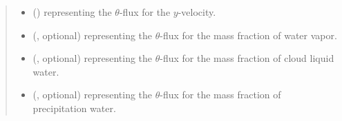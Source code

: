 \documentclass[letterpaper,10pt,english]{sphinxmanual}
\begin{document}
\begin{fulllineitems}
\begin{fulllineitems}
\begin{quote}
\begin{description}
\begin{itemize}
\item {} 
 () \textendash{}  representing the \(\theta\)-flux for the \(y\)-velocity.

\item {} 
 (, optional) \textendash{}  representing the \(\theta\)-flux for the mass fraction of water vapor.

\item {} 
 (, optional) \textendash{}  representing the \(\theta\)-flux for the mass fraction of cloud liquid water.

\item {} 
 (, optional) \textendash{}  representing the \(\theta\)-flux for the mass fraction of precipitation water.

\end{itemize}


\end{description}\end{quote}

\end{fulllineitems}


\end{fulllineitems}

\end{document}
